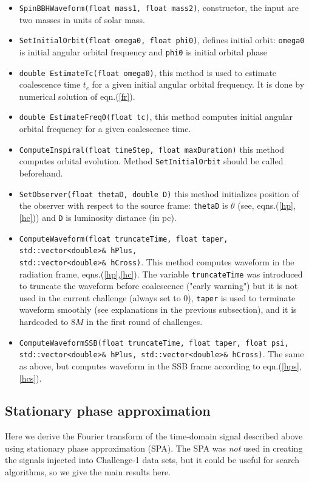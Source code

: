 \documentclass[11pt]{report}
\begin{document}
\begin{itemize}
\item {\tt SpinBBHWaveform(float mass1, float mass2)}, constructor, the
input are two masses in units of solar mass.
\item {\tt SetInitialOrbit(float omega0, float phi0)}, defines initial orbit:
{\tt omega0} is initial angular orbital frequency and {\tt phi0} is initial
orbital phase
\item {\tt double EstimateTc(float omega0)}, this method is used to estimate
coalescence time $t_c$ for a given initial angular orbital frequency. It
is done by numerical solution of eqn.(\ref{fr}).
\item {\tt double EstimateFreq0(float tc)}, this method computes initial
angular orbital frequency for a given coalescence time.
\item {\tt ComputeInspiral(float timeStep, float maxDuration)}
this method computes orbital evolution. Method {\tt SetInitialOrbit}
should be called beforehand.
\item {\tt SetObserver(float thetaD, double D)} this method initializes
position of the observer with respect to the source frame: 
{\tt thetaD} is $\theta$ (see, eqns.(\ref{hp}, \ref{hc})) and {\tt D} is luminosity distance (in pc).
\item {\tt ComputeWaveform(float truncateTime, float taper, std::vector<double>\& hPlus, \\std::vector<double>\& hCross)}. This method computes waveform in the
radiation frame, eqns.(\ref{hp},\ref{hc}). The variable {\tt truncateTime}
was introduced to truncate the waveform before coalescence ("early warning")
but it is not used in the current challenge (always set to $0$), {\tt taper}
is used to terminate waveform smoothly (see explanations in the previous
subsection), and it is hardcoded to $8M$ in the first round of challenges.
\item {\tt ComputeWaveformSSB(float truncateTime, float taper, float psi, 
		       std::vector<double>\& hPlus, std::vector<double>\& hCross)}.
The same as above, but computes waveform in the SSB frame according to
eqn.(\ref{hps}, \ref{hcs}).


\end{itemize}

\subsection{Stationary phase approximation}

Here we derive the Fourier transform of the time-domain signal 
described above using stationary phase approximation (SPA).
The SPA was {\it not} used in creating the signals injected into
Challenge-1 data sets, but it could be useful for search algorithms, so
we give the main results here.
\end{document}
